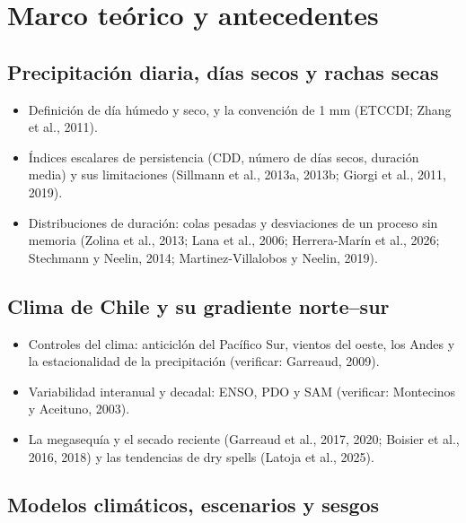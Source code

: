 \chapter{Marco teórico y antecedentes}\label{cap:2}


\section{Precipitación diaria, días secos y rachas secas}\label{sec:mt_rachas}

\begin{itemize}
\tightlist
\item
  Definición de día húmedo y seco, y la convención de 1 mm (ETCCDI; Zhang et al., 2011).
\item
  Índices escalares de persistencia (CDD, número de días secos, duración media) y sus limitaciones (Sillmann et al., 2013a, 2013b; Giorgi et al., 2011, 2019).
\item
  Distribuciones de duración: colas pesadas y desviaciones de un proceso sin memoria (Zolina et al., 2013; Lana et al., 2006; Herrera-Marín et al., 2026; Stechmann y Neelin, 2014; Martinez-Villalobos y Neelin, 2019).
\end{itemize}

\section{Clima de Chile y su gradiente norte--sur}\label{sec:mt_clima}

\begin{itemize}
\tightlist
\item
  Controles del clima: anticiclón del Pacífico Sur, vientos del oeste, los Andes y la estacionalidad de la precipitación (verificar: Garreaud, 2009).
\item
  Variabilidad interanual y decadal: ENSO, PDO y SAM (verificar: Montecinos y Aceituno, 2003).
\item
  La megasequía y el secado reciente (Garreaud et al., 2017, 2020; Boisier et al., 2016, 2018) y las tendencias de dry spells (Latoja et al., 2025).
\end{itemize}

\section{Modelos climáticos, escenarios y sesgos}\label{sec:mt_modelos}

